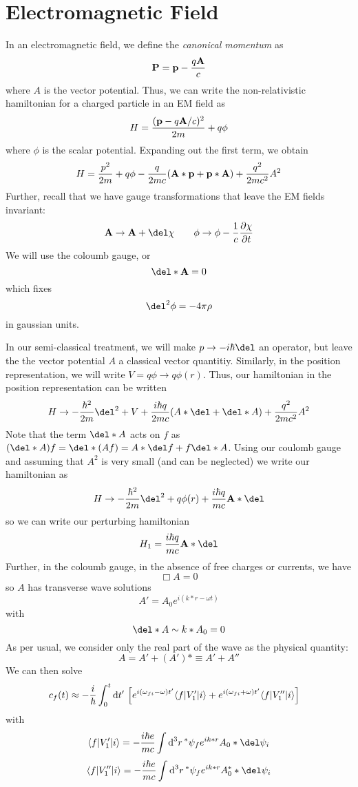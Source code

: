 \section{Electromagnetic Field}
In an electromagnetic field, we define the \emph{canonical momentum} as
\[\mathbf{P} = \mathbf{p}-\frac{q\mathbf{A}}{c}\]
where \(A\) is the vector potential. Thus, we can write the non-relativistic hamiltonian for a charged particle in an EM field as
\begin{equation}
	H = \frac{(\mathbf{p}-q\mathbf{A}/c)^2}{2m}+q\phi
\end{equation}
where \(\phi\) is the scalar potential. Expanding out the first term, we obtain
\[H = \frac{p^2}{2m}+q\phi - \frac{q}{2mc}(\mathbf{A}*\mathbf{p}+\mathbf{p}*\mathbf{A}) + \frac{q^2}{2mc^2}A^2\]
Further, recall that we have gauge transformations that leave the EM fields invariant:
\[\vb A\to\vb A+\del \chi \qquad \phi\to \phi-\frac{1}{c}\pder{\chi}{t}\]
We will use the coloumb gauge, or
\begin{equation}
	\del*\vb A = 0
\end{equation}
which fixes 
\[\del^2\phi = -4\pi\rho\]
in gaussian units.

In our semi-classical treatment, we will make \(p \to -i\hbar\del\) an operator, but leave the the vector potential \(A\) a classical vector quantitiy. Similarly, in the position representation, we will write \(V = q\phi\to q\phi(r)\). Thus, our hamiltonian in the position representation can be written
\[H\to -\frac{\hbar^2}{2m}\del^2 + V + \frac{i\hbar q}{2mc}(A*\del + \del*A) + \frac{q^2}{2mc^2}A^2
\]
Note that the term \(\del*A\) acts on \(f\) as \((\del*A)f = \del*(Af) = A*\del f + f\del*A\). Using our coulomb gauge and assuming that \(A^2\) is very small (and can be neglected) we write our hamiltonian as
\begin{equation}
	H\to -\frac{\hbar^2}{2m}\del^2 + q\phi(r) + \frac{i\hbar q}{mc}\vb A*\del
\end{equation}
so we can write our perturbing hamiltonian
\begin{equation}
	H_1 = \frac{i\hbar q}{mc}\vb A*\del
\end{equation}
Further, in the coloumb gauge, in the absence of free charges or currents, we have
\[\Box A = 0\]
so \(A\) has transverse wave solutions
\[A' = A_0 e^{i(k*r-\omega t)}\]
with
\[\del*A\sim k*A_0 = 0\]
As per usual, we consider only the real part of the wave as the physical quantity:
\[A = A' + (A')\ast\equiv A'+A''\]
We can then solve
\begin{align*}
c_f(t)&\approx -\frac{i}{\hbar}\int_0^t\d{t'}\left[e^{i(\omega_{fi}-\omega)t'}\b{f}V_1'\k{i}+e^{i(\omega_{fi}+\omega)t'}\b{f}V_1''\k{i}\right]
\end{align*}
with
\[\b{f}V_1'\k{i} =-\frac{i\hbar e}{mc}\int\d[3]{r} \ast \p_f e^{ik*r}A_0*\del \p_i\]
\[\b{f}V_1''\k{i} =-\frac{i\hbar e}{mc}\int\d[3]{r} \ast \p_f e^{ik*r}A_0\ast*\del \p_i\]
